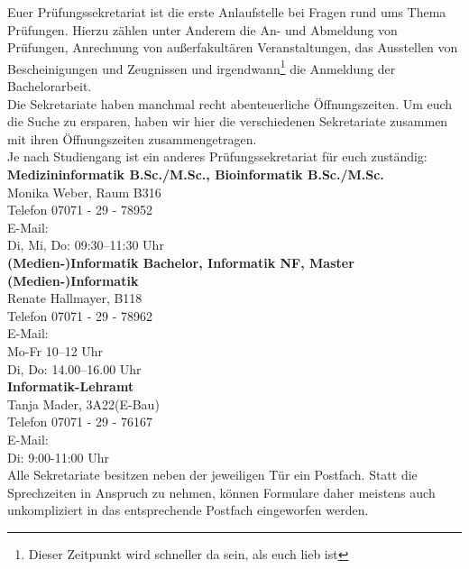Euer Prüfungssekretariat ist die erste Anlaufstelle bei Fragen rund ums Thema Prüfungen. Hierzu zählen unter Anderem die An- und Abmeldung von Prüfungen, Anrechnung von außerfakultären Veranstaltungen,
das Ausstellen von Bescheinigungen und Zeugnissen und irgendwann\footnote{Dieser Zeitpunkt wird schneller da sein, als euch lieb ist} die Anmeldung der Bachelorarbeit.\\
Die Sekretariate haben manchmal recht abenteuerliche Öffnungszeiten. Um euch die Suche zu ersparen, haben wir hier die verschiedenen Sekretariate zusammen mit ihren Öffnungszeiten zusammengetragen.\\
Je nach Studiengang ist ein anderes Prüfungssekretariat für euch zuständig: \\


\textbf{Medizininformatik B.Sc./M.Sc., Bioinformatik B.Sc./M.Sc.}\\ Monika Weber, Raum B316\\
Telefon 07071 - 29 - 78952\\
E-Mail: \\
Di, Mi, Do: 09:30–11:30 Uhr\\

\textbf{(Medien-)Informatik Bachelor, Informatik NF, Master (Medien-)Informatik}\\
Renate Hallmayer, B118\\
Telefon 07071 - 29 - 78962\\
E-Mail: \\
Mo-Fr 10–12 Uhr\\
Di, Do: 14.00–16.00 Uhr\\

\textbf{Informatik-Lehramt}\\
Tanja Mader, 3A22(E-Bau)\\
Telefon 07071 - 29 - 76167\\
E-Mail: \\
Di: 9:00-11:00 Uhr\\

Alle Sekretariate besitzen neben der jeweiligen Tür ein Postfach. Statt die Sprechzeiten in Anspruch zu nehmen, können Formulare daher meistens auch unkompliziert in das entsprechende Postfach eingeworfen werden.\\
